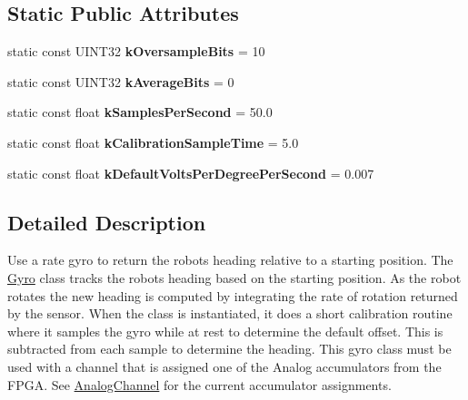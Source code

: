 \subsection*{Static Public Attributes}
\begin{DoxyCompactItemize}
\item 
\hypertarget{classGyro_aa5a4a22bd8b619a7ebb221b9412a1597}{
static const UINT32 {\bfseries kOversampleBits} = 10}
\label{classGyro_aa5a4a22bd8b619a7ebb221b9412a1597}

\item 
\hypertarget{classGyro_a491e633f55680ff58d8dd8fde169dc8b}{
static const UINT32 {\bfseries kAverageBits} = 0}
\label{classGyro_a491e633f55680ff58d8dd8fde169dc8b}

\item 
\hypertarget{classGyro_a64c71dccfd49e35c8723be4d3471029c}{
static const float {\bfseries kSamplesPerSecond} = 50.0}
\label{classGyro_a64c71dccfd49e35c8723be4d3471029c}

\item 
\hypertarget{classGyro_a97cf14846097a6daf64f25955addb347}{
static const float {\bfseries kCalibrationSampleTime} = 5.0}
\label{classGyro_a97cf14846097a6daf64f25955addb347}

\item 
\hypertarget{classGyro_ae668f3598a0f225fb68b820888e66f3a}{
static const float {\bfseries kDefaultVoltsPerDegreePerSecond} = 0.007}
\label{classGyro_ae668f3598a0f225fb68b820888e66f3a}

\end{DoxyCompactItemize}


\subsection{Detailed Description}
Use a rate gyro to return the robots heading relative to a starting position. The \hyperlink{classGyro}{Gyro} class tracks the robots heading based on the starting position. As the robot rotates the new heading is computed by integrating the rate of rotation returned by the sensor. When the class is instantiated, it does a short calibration routine where it samples the gyro while at rest to determine the default offset. This is subtracted from each sample to determine the heading. This gyro class must be used with a channel that is assigned one of the Analog accumulators from the FPGA. See \hyperlink{classAnalogChannel}{AnalogChannel} for the current accumulator assignments. 

